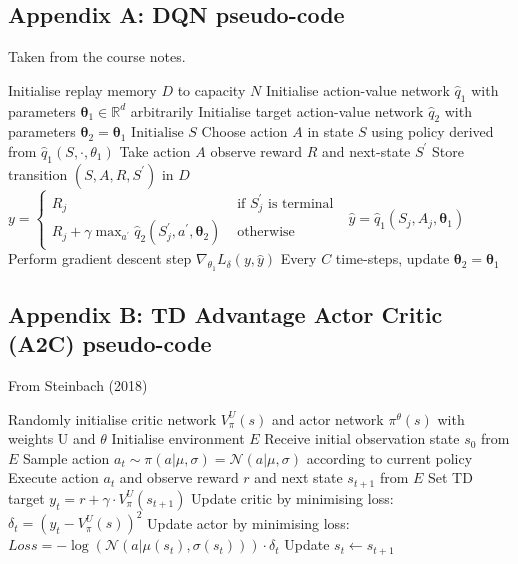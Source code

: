 \documentclass{article}
\begin{document}
\subsection*{Appendix A: DQN pseudo-code}
\label{dqn_pseudo}
Taken from the course notes.
\begin{algorithmic}[1]
\State Initialise replay memory $D$ to capacity $N$
\State Initialise action-value network $\hat{q}_{1}$ with parameters $\boldsymbol{\theta}_{1} \in \mathbb{R}^{d}$ arbitrarily
\State Initialise target action-value network $\hat{q}_{2}$ with parameters $\boldsymbol{\theta}_{2}=\boldsymbol{\theta}_{1}$
    \State $\text{Initialise } S$
        \State Choose action $A$ in state $S$ using policy derived from  $\hat{q}_{1}\left(S, \cdot, \theta_{1}\right)$
        \State Take action $A$ observe reward $R$ and next-state $S^{\prime}$
        \State Store transition $\left(S, A, R, S^{\prime}\right)$ in $D$
            \State $y= \begin{cases}R_{j} & \text { if } S_{j}^{\prime} \text { is terminal } \\ R_{j}+\gamma \max _{a^{\prime}} \hat{q}_{2}\left(S_{j}^{\prime}, a^{\prime}, \boldsymbol{\theta}_{2}\right) & \text { otherwise }\end{cases}$
            \State $\hat{y}=\hat{q}_{1}\left(S_{j}, A_{j}, \boldsymbol{\theta}_{1}\right)$
            \State Perform gradient descent step $\nabla_{\theta_{1}} L_{\delta}(y, \hat{y})$
        \EndFor
    \State Every $C$ time-steps, update $\boldsymbol{\theta}_{2}=\boldsymbol{\theta}_{1}$
    \EndFor
\EndFor
\end{algorithmic}

\subsection*{Appendix B: TD Advantage Actor Critic (A2C) pseudo-code}
\label{async_a2c_pseudo}

From Steinbach (2018)

\begin{algorithmic}[1]
\State Randomly initialise critic network $V^{U}_{\pi}(s)$ and actor network $\pi^{\theta}(s)$ with weights U and $\theta$
\State Initialise environment $E$
\State Receive initial observation state $s_{0}$ from $E$
\State Sample action $a_{t} \sim \pi(a | \mu, \sigma) = \mathcal{N}(a | \mu, \sigma)$ according to current policy
\State Execute action $a_{t}$ and observe reward $r$ and next state $s_{t+1}$ from $E$
\State Set TD target $y_{t} = r + \gamma \cdot V^{U}_{\pi}(s_{t+1})$
\State Update critic by minimising loss: $\delta_{t} = (y_{t} - V^{U}_{\pi}(s))^{2}$
\State Update actor by minimising loss: $Loss = -\log({\mathcal{N}(a | \mu(s_{t}), \sigma(s_{t}))}) \cdot \delta_{t}$
\State Update $s_{t} {\leftarrow} s_{t+1}$
\EndFor
\EndFor
\end{algorithmic}
\end{document}
